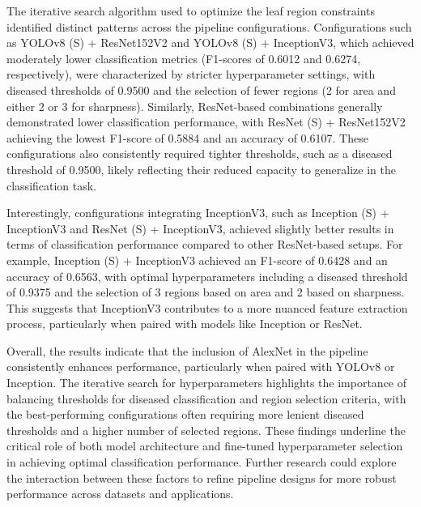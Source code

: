\documentclass[draft,final]{vutinfth} %
\begin{document}
The iterative search algorithm used to optimize the leaf region constraints identified distinct patterns across the pipeline configurations. Configurations such as YOLOv8 (S) + ResNet152V2 and YOLOv8 (S) + InceptionV3, which achieved moderately lower classification metrics (F1-scores of 0.6012 and 0.6274, respectively), were characterized by stricter hyperparameter settings, with diseased thresholds of 0.9500 and the selection of fewer regions (2 for area and either 2 or 3 for sharpness). Similarly, ResNet-based combinations generally demonstrated lower classification performance, with ResNet (S) + ResNet152V2 achieving the lowest F1-score of 0.5884 and an accuracy of 0.6107. These configurations also consistently required tighter thresholds, such as a diseased threshold of 0.9500, likely reflecting their reduced capacity to generalize in the classification task.

Interestingly, configurations integrating InceptionV3, such as Inception (S) + InceptionV3 and ResNet (S) + InceptionV3, achieved slightly better results in terms of classification performance compared to other ResNet-based setups. For example, Inception (S) + InceptionV3 achieved an F1-score of 0.6428 and an accuracy of 0.6563, with optimal hyperparameters including a diseased threshold of 0.9375 and the selection of 3 regions based on area and 2 based on sharpness. This suggests that InceptionV3 contributes to a more nuanced feature extraction process, particularly when paired with models like Inception or ResNet.

Overall, the results indicate that the inclusion of AlexNet in the pipeline consistently enhances performance, particularly when paired with YOLOv8 or Inception. The iterative search for hyperparameters highlights the importance of balancing thresholds for diseased classification and region selection criteria, with the best-performing configurations often requiring more lenient diseased thresholds and a higher number of selected regions. These findings underline the critical role of both model architecture and fine-tuned hyperparameter selection in achieving optimal classification performance. Further research could explore the interaction between these factors to refine pipeline designs for more robust performance across datasets and applications.
\end{document}

